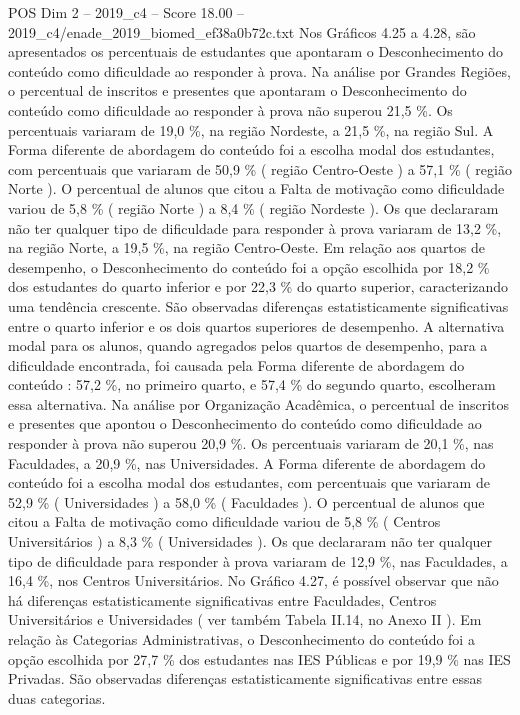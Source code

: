 \begin{textsample}{POS Dim 2 – 2019\_c4 – Score 18.00 – 2019\_c4/enade\_2019\_biomed\_ef38a0b72c.txt}
Nos Gráficos 4.25 a 4.28, são apresentados os percentuais de estudantes que apontaram o Desconhecimento do conteúdo como dificuldade ao responder à prova.
Na análise por Grandes Regiões, o percentual de inscritos e presentes que apontaram o Desconhecimento do conteúdo como dificuldade ao responder à prova não superou 21,5 \%.
Os percentuais variaram de 19,0 \%, na região Nordeste, a 21,5 \%, na região Sul.
A Forma diferente de abordagem do conteúdo foi a escolha modal dos estudantes, com percentuais que variaram de 50,9 \% ( região Centro-Oeste ) a 57,1 \% ( região Norte ).
O percentual de alunos que citou a Falta de motivação como dificuldade variou de 5,8 \% ( região Norte ) a 8,4 \% ( região Nordeste ).
Os que declararam não ter qualquer tipo de dificuldade para responder à prova variaram de 13,2 \%, na região Norte, a 19,5 \%, na região Centro-Oeste.
Em relação aos quartos de desempenho, o Desconhecimento do conteúdo foi a opção escolhida por 18,2 \% dos estudantes do quarto inferior e por 22,3 \% do quarto superior, caracterizando uma tendência crescente.
São observadas diferenças estatisticamente significativas entre o quarto inferior e os dois quartos superiores de desempenho.
A alternativa modal para os alunos, quando agregados pelos quartos de desempenho, para a dificuldade encontrada, foi causada pela Forma diferente de abordagem do conteúdo : 57,2 \%, no primeiro quarto, e 57,4 \% do segundo quarto, escolheram essa alternativa.
Na análise por Organização Acadêmica, o percentual de inscritos e presentes que apontou o Desconhecimento do conteúdo como dificuldade ao responder à prova não superou 20,9 \%.
Os percentuais variaram de 20,1 \%, nas Faculdades, a 20,9 \%, nas Universidades.
A Forma diferente de abordagem do conteúdo foi a escolha modal dos estudantes, com percentuais que variaram de 52,9 \% ( Universidades ) a 58,0 \% ( Faculdades ).
O percentual de alunos que citou a Falta de motivação como dificuldade variou de 5,8 \% ( Centros Universitários ) a 8,3 \% ( Universidades ).
Os que declararam não ter qualquer tipo de dificuldade para responder à prova variaram de 12,9 \%, nas Faculdades, a 16,4 \%, nos Centros Universitários.
No Gráfico 4.27, é possível observar que não há diferenças estatisticamente significativas entre Faculdades, Centros Universitários e Universidades ( ver também Tabela II.14, no Anexo II ).
Em relação às Categorias Administrativas, o Desconhecimento do conteúdo foi a opção escolhida por 27,7 \% dos estudantes nas IES Públicas e por 19,9 \% nas IES Privadas.
São observadas diferenças estatisticamente significativas entre essas duas categorias.

\end{textsample}

